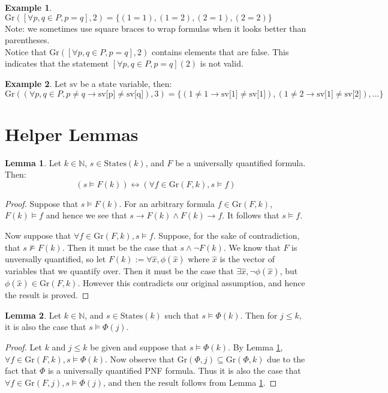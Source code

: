 \documentclass[12pt]{article}
\theoremstyle{definition}
\newtheorem{lemma}{Lemma}
\newtheorem{example}{Example}
\theoremstyle{remark}
\newcommand{\states}{\text{States}}
\newcommand{\gr}{\text{Gr}}
\begin{document}
\begin{example}
  $\gr([\forall p,q \in P, p=q],2) = \{(1=1),(1=2),(2=1),(2=2)\}$\\
  Note: we sometimes use square braces to wrap formulas when it looks better than parentheses.\\
  Notice that $\gr([\forall p,q \in P, p=q],2)$ contains elements that are false.  This indicates that the statement $[\forall p,q \in P, p=q](2)$ is not valid.
\end{example}
\begin{example}
  Let $\text{sv}$ be a state variable, then:
  $$\gr((\forall p,q \in P, p \neq q \rightarrow \text{sv[p]} \neq \text{sv[q]}),3) = \{(1 \neq 1 \rightarrow \text{sv[1]} \neq \text{sv[1]}),(1 \neq 2 \rightarrow \text{sv[1]} \neq \text{sv[2]}),...\}$$
\end{example}



\section{Helper Lemmas}

\begin{lemma}
  \label{lem:pnf-ground}
  Let $k \in \mathbb{N}$, $s \in \states(k)$, and $F$ be a universally quantified formula.  Then:
  $$(s \models F(k)) \leftrightarrow (\forall f \in \gr(F,k), s \models f)$$
\end{lemma}
\begin{proof}
  Suppose that $s \models F(k)$.  For an arbitrary formula $f \in \gr(F,k)$, $F(k) \models f$ and hence we see that $s \rightarrow F(k) \land F(k) \rightarrow f$.  It follows that $s \models f$.

  Now suppose that $\forall f \in \gr(F,k), s \models f$.  Suppose, for the sake of contradiction, that $s \not\models F(k)$.  Then it must be the case that $s \land \neg F(k)$.  We know that $F$ is unversally quantified, so let $F(k) := \forall \hat{x}, \phi(\hat{x})$ where $\hat{x}$ is the vector of variables that we quantify over.  Then it must be the case that $\exists \hat{x}, \neg \phi(\hat{x})$, but $\phi(\hat{x}) \in \gr(F,k)$.  However this contradicts our original assumption, and hence the result is proved.
\end{proof}

\begin{lemma}
  \label{lem:lt-sat}
  Let $k \in \mathbb{N}$, and $s \in \states(k)$ such that $s \models \Phi(k)$.  Then for $j \leq k$, it is also the case that $s \models \Phi(j)$.
\end{lemma}
\begin{proof}
  Let $k$ and $j \leq k$ be given and suppose that $s \models \Phi(k)$.  By Lemma \ref{lem:pnf-ground}, $\forall f \in \gr(F,k), s \models \Phi(k)$.  Now observe that $\gr(\Phi,j) \subseteq \gr(\Phi,k)$ due to the fact that $\Phi$ is a universally quantified PNF formula.  Thus it is also the case that $\forall f \in \gr(F,j), s \models \Phi(j)$, and then the result follows from Lemma \ref{lem:pnf-ground}.
\end{proof}
\end{document}
